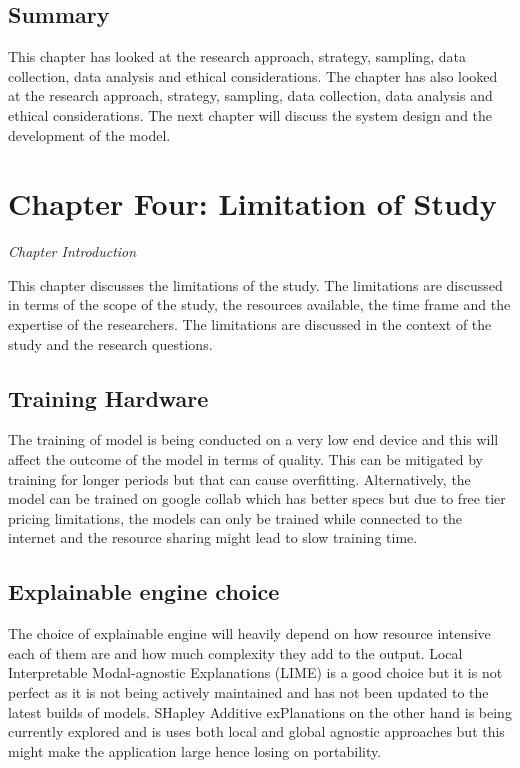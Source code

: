 \documentclass[12pt,a4paper]{article}
\begin{document}
\subsection{Summary}
This chapter has looked at the research approach, strategy, sampling, data collection, data analysis and ethical considerations. The chapter has also looked at the research approach, strategy, sampling, data collection, data analysis and ethical considerations. The next chapter will discuss the system design and the development of the model.

\newpage

\section{Chapter Four: Limitation of Study}
\textit{Chapter Introduction}

This chapter discusses the limitations of the study. The limitations are discussed in terms of the scope of the study, the resources available, the time frame and the expertise of the researchers. The limitations are discussed in the context of the study and the research questions.

\subsection{Training Hardware}
The training of model is being conducted on a very low end device and this will affect the outcome of the model in terms of quality. This can be mitigated by training for longer periods but that can cause overfitting. Alternatively, the model can be trained on google collab which has better specs but due to free tier pricing limitations, the models can only be trained while connected to the internet and the resource sharing might lead to slow training time.

\subsection{Explainable engine choice} 
The choice of explainable engine will heavily depend on how resource intensive each of them are and how much complexity they add to the output. Local Interpretable Modal-agnostic Explanations (LIME) is a good choice but it is not perfect as it is not being actively maintained and has not been updated to the latest builds of models.
SHapley Additive exPlanations on the other hand is being currently explored and is uses both local and global agnostic approaches but this might make the application large hence losing on portability.
\end{document}
